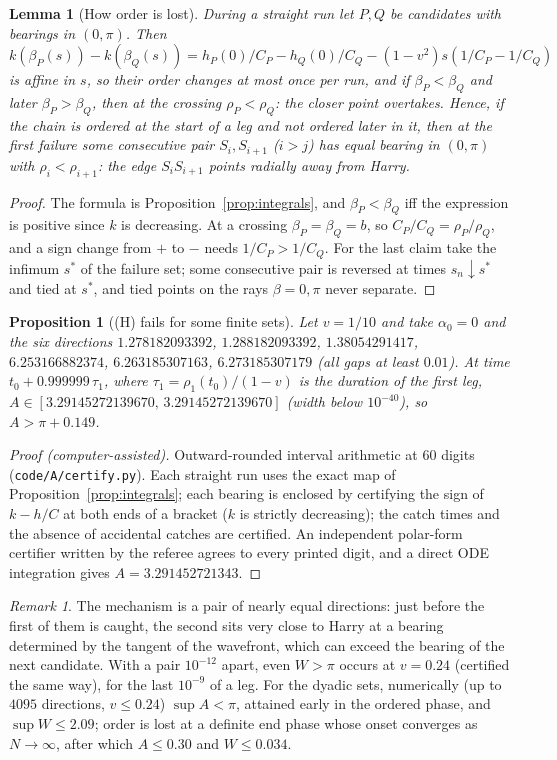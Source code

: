 \documentclass[11pt]{article}
\newtheorem{lemma}{Lemma}
\newtheorem{proposition}{Proposition}
\theoremstyle{remark}\newtheorem{remark}{Remark}
\begin{document}
\begin{lemma}[How order is lost]\label{lem:A4}
During a straight run let $P,Q$ be candidates with bearings in $(0,\pi)$. Then $k(\beta_P(s))-k(\beta_Q(s))=
h_P(0)/C_P-h_Q(0)/C_Q-(1-v^2)s(1/C_P-1/C_Q)$ is affine in $s$, so their order changes at most once per run, and if $\beta_P<\beta_Q$
and later $\beta_P>\beta_Q$, then at the crossing $\rho_P<\rho_Q$: the closer point overtakes. Hence, if the chain is ordered at the
start of a leg and not ordered later in it, then at the first failure some consecutive pair $S_i,S_{i+1}$ ($i>j$) has equal bearing
in $(0,\pi)$ with $\rho_i<\rho_{i+1}$: the edge $S_iS_{i+1}$ points radially away from Harry.
\end{lemma}
\begin{proof}
The formula is Proposition~\ref{prop:integrals}, and $\beta_P<\beta_Q$ iff the expression is positive since $k$ is decreasing.
At a crossing $\beta_P=\beta_Q=b$, so $C_P/C_Q=\rho_P/\rho_Q$, and a sign change from $+$ to $-$ needs $1/C_P>1/C_Q$. For the last
claim take the infimum $s^*$ of the failure set; some consecutive pair is reversed at times $s_n\downarrow s^*$ and tied at $s^*$, and
tied points on the rays $\beta=0,\pi$ never separate.
\end{proof}

\begin{proposition}[(H) fails for some finite sets]\label{prop:A9}
Let $v=1/10$ and take $\alpha_0=0$ and the six directions $1.278182093392$, $1.288182093392$, $1.38054291417$, $6.253166882374$,
$6.263185307163$, $6.273185307179$ (all gaps at least $0.01$). At time $t_0+0.999999\,\tau_1$, where $\tau_1=\rho_1(t_0)/(1-v)$ is the
duration of the first leg, $A\in[3.29145272139670,\,3.29145272139670]$ (width below $10^{-40}$), so $A>\pi+0.149$.
\end{proposition}
\begin{proof}[Proof (computer-assisted)]
Outward-rounded interval arithmetic at 60 digits (\texttt{code/A/certify.py}). Each straight run uses the exact map of
Proposition~\ref{prop:integrals}; each bearing is enclosed by certifying the sign of $k-h/C$ at both ends of a bracket ($k$ is strictly
decreasing); the catch times and the absence of accidental catches are certified. An independent polar-form certifier written by
the referee agrees to every printed digit, and a direct ODE integration gives $A=3.291452721343$.
\end{proof}
\begin{remark}
The mechanism is a pair of nearly equal directions: just before the first of them is caught, the second sits very close to Harry at
a bearing determined by the tangent of the wavefront, which can exceed the bearing of the next candidate. With a pair $10^{-12}$
apart, even $W>\pi$ occurs at $v=0.24$ (certified the same way), for the last $10^{-9}$ of a leg. For the dyadic sets, numerically
(up to $4095$ directions, $v\le0.24$) $\sup A<\pi$, attained early in the ordered phase, and $\sup W\le2.09$; order is lost at a
definite end phase whose onset converges as $N\to\infty$, after which $A\le0.30$ and $W\le0.034$.
\end{remark}
\end{document}
